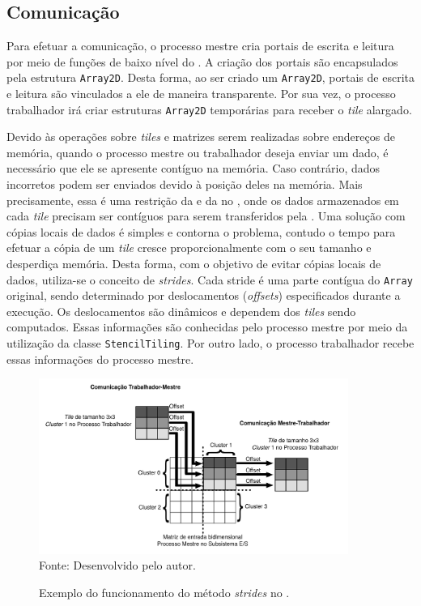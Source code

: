 


\subsection{Comunicação}
\label{sec:comunicacao}

Para efetuar a comunicação, o processo mestre cria portais de escrita e leitura
por meio de funções de baixo nível do \mppa. A criação dos portais são encapsulados pela
estrutura \texttt{Array2D}. Desta forma, ao ser criado um \texttt{Array2D},
portais de escrita e leitura são vinculados a ele de maneira transparente. Por sua vez, o
processo trabalhador irá criar estruturas \texttt{Array2D} temporárias para
receber o \textit{tile} alargado.

Devido às operações sobre \textit{tiles} e matrizes serem realizadas sobre
endereços de memória, quando o processo mestre ou trabalhador deseja enviar um
dado, é necessário que ele se apresente contíguo na memória. Caso contrário,
dados incorretos podem ser enviados devido à posição deles na memória. Mais
precisamente, essa é uma restrição da \api e da \noc no \mppa, onde os dados
armazenados em cada \textit{tile} precisam ser contíguos para serem transferidos
pela \noc. Uma solução com cópias locais de dados é simples e contorna o
problema, contudo o tempo para efetuar a cópia de um \textit{tile} cresce
proporcionalmente com o seu tamanho e desperdiça memória. Desta forma, com o
objetivo de evitar cópias locais de dados, utiliza-se o conceito de
\textit{strides}. Cada stride é uma parte contígua do \texttt{Array} original,
sendo determinado por deslocamentos (\textit{offsets}) especificados durante a
execução. Os deslocamentos são dinâmicos e dependem dos \textit{tiles} sendo
computados. Essas informações são conhecidas pelo processo mestre
por meio da utilização da classe \texttt{StencilTiling}. Por outro lado, o
processo trabalhador recebe essas informações do processo mestre.

\begin{figure}[t]
	\centering
    \caption{Exemplo do funcionamento do método \textit{strides} no \mppa.}
	\includegraphics[width=0.9\textwidth]{figs/stridesImage.pdf} \\
    Fonte: Desenvolvido pelo autor.
	\label{fig:strides}
\end{figure}

